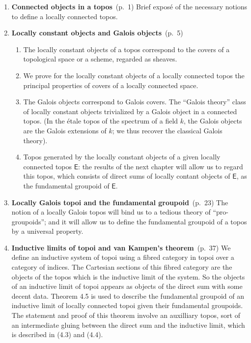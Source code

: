 \documentclass[10pt,oneside]{amsart}
\newcommand{\oldpage}[1]{\marginnote{\textbf{#1}}}
\newcommand{\cat}{\mathsf}
\begin{document}
\begin{enumerate}[label=\arabic*.]
  \item \textbf{Connected objects in a topos}~(p.~1)
    Brief expos\'e of the necessary notions to define a locally connected topos.
  \item \textbf{Locally constant objects and Galois objects}~(p.~5)
    \begin{enumerate}[label=2.\arabic*.]
      \item The locally constant objects of a topos correspond to the covers of a topological space or a scheme, regarded as sheaves.
      \item We prove for the locally constant objects of a locally connected topos the principal properties of covers of a locally connected space.
      \item The Galois objects correspond to Galois covers.
        The ``Galois theory'' class of locally constant objects trivialized by a Galois object in a connected topos.
        (In the \'etale topos of the spectrum of a field $k$, the Galois objects are the Galois extensions of $k$;
        we thus recover the classical Galois theory).
      \item Topos generated by the locally constant objects of a given locally connected topos $\cat{E}$:
        the results of the next chapter will allow us to regard this topos, which consists of direct sums of locally contant objects of $\cat{E}$, as the fundamental groupoid of $\cat{E}$.
    \end{enumerate}
  \item \textbf{Locally Galois topoi and the fundamental groupoid}~(p.~23)
    The notion of a locally Galois topos will bind us to a tedious theory of ``pro-groupoids'';
    and it will allow us to define the fundamental groupoid of a topos by a universal property.
  \item \textbf{Inductive limits of topoi and van Kampen's theorem}~(p.~37)
    We define an inductive system of topoi using a fibred category in topoi over a category of indices.
    The Cartesian sections of this fibred category \oldpage{II} are the objects of the topos which is the inductive limit of the system.
    So the objects of an inductive limit of topoi appears as objects of the direct sum with some decent data.
    Theorem 4.5 is used to describe the fundamental groupoid of an inductive limit of locally connected topoi given their fundamental groupoids.
    The statement and proof of this theorem involve an auxilliary topos, sort of an intermediate gluing between the direct sum and the inductive limit, which is described in (4.3) and (4.4).

\end{enumerate}
\end{document}
